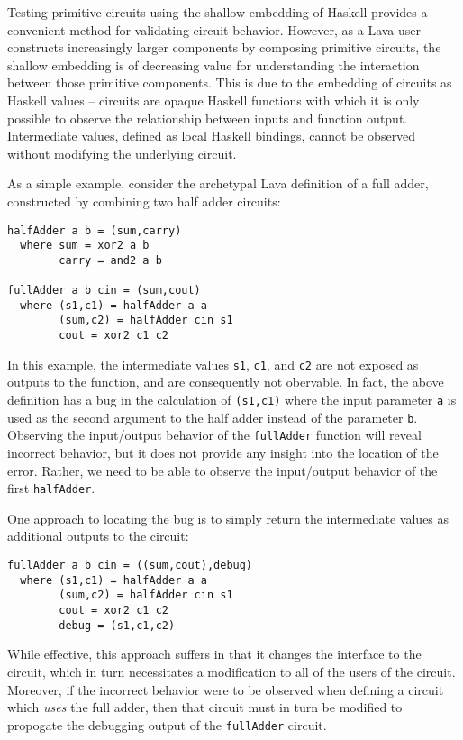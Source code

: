 \documentclass{llncs}
\begin{document}
Testing primitive circuits using the shallow embedding of Haskell provides a
convenient method for validating circuit behavior. However, as a Lava user
constructs increasingly larger components by composing primitive circuits, the shallow
embedding is of decreasing value for understanding the interaction between
those primitive components. This is due to the embedding of circuits as Haskell
values -- circuits are opaque Haskell functions with which it is only possible
to observe the relationship between inputs and function output. Intermediate
values, defined as local Haskell bindings, cannot be observed without modifying
the underlying circuit.

As a simple example, consider the archetypal Lava definition of a full adder,
constructed by combining two half adder circuits:

\begin{verbatim}
halfAdder a b = (sum,carry)
  where sum = xor2 a b
        carry = and2 a b

fullAdder a b cin = (sum,cout)
  where (s1,c1) = halfAdder a a
        (sum,c2) = halfAdder cin s1
        cout = xor2 c1 c2
\end{verbatim}

In this example, the intermediate values \verb!s1!, \verb!c1!, and \verb!c2! are
not exposed as outputs to the function, and are consequently not
obervable. In fact, the above definition has a bug in the calculation of
\verb!(s1,c1)! where the input parameter \verb!a! is used as the second argument
to the half adder instead of the parameter \verb!b!. Observing the input/output
behavior of the \verb!fullAdder! function will reveal incorrect behavior, but it
does not provide any insight into the location of the error. Rather, we need to
be able to observe the input/output behavior of the first \verb!halfAdder!.

One approach to locating the bug is to simply return the intermediate values as
additional outputs to the circuit:

\begin{verbatim}
fullAdder a b cin = ((sum,cout),debug)
  where (s1,c1) = halfAdder a a
        (sum,c2) = halfAdder cin s1
        cout = xor2 c1 c2
        debug = (s1,c1,c2)
\end{verbatim}

While effective, this approach suffers in that it changes the interface to the
circuit, which in turn necessitates a modification to all of the users of the
circuit. Moreover, if the incorrect behavior were to be observed when defining a
circuit which \emph{uses} the full adder, then that circuit must in turn be
modified to propogate the debugging output of the \verb!fullAdder! circuit.
\end{document}
